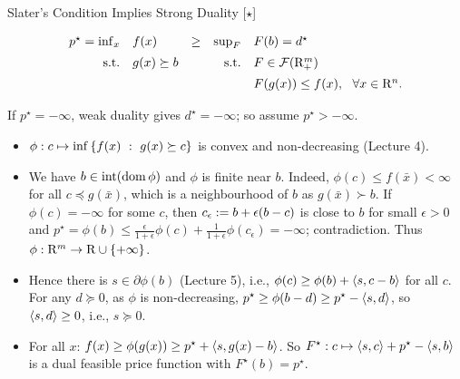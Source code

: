 \documentclass[9pt]{beamer}
\begin{document}
\begin{frame}{Slater's Condition Implies Strong Duality [$\star$]}

  \[
    \begin{array}{rlcrl}
      p^\star= \inf_x & f(x)  & \geq & \sup_F & F(b) = d^\star \\[0.5em]
      \mathrm{s.t.} & g(x) \succeq b   & &                       \mathrm{s.t.} & F \in \mathcal F(\mathrm{R}^m_+) \\[0.5em]
             & &&    & F(g(x)) \leq f(x), ~~\forall x \in \mathrm{R}^n.
    \end{array}
  \]

  If $p^\star=-\infty$, weak duality gives $d^\star=-\infty$; so assume $p^\star>-\infty$.  

  \vfill

  \begin{itemize}
    \setlength\itemsep{1em}
  \item<2-> $\phi: c \mapsto \inf\left\{ f(x)\ : \ g(x)\succeq c \right\}$ is convex and non-decreasing (Lecture 4).
  \item<3-> We have $b\in\operatorname{int}(\operatorname{dom}\phi)$ and $\phi$ is finite near $b$.
    Indeed,
    $\phi(c)\leq f(\bar x)<\infty$ for all $c\preceq g(\bar x)$, which is a neighbourhood of $b$ as $g(\bar x)\succ b$. If $\phi(c)=-\infty$ for some $c$, then $c_\epsilon:= b+\epsilon(b-c)$ is close to $b$ for small $\epsilon>0$ and $p^\star=\phi(b)\leq\frac{\epsilon}{1+\epsilon}\phi(c)+\frac{1}{1+\epsilon}\phi(c_\epsilon)=-\infty$; contradiction. Thus $\phi:\mathrm{R}^m\to\mathrm{R}\cup\{+\infty\}$.
  \item<4-> Hence there is $s\in\partial\phi(b)$ (Lecture 5), i.e., $\phi(c)\geq\phi(b)+\left<s, c-b\right>$ for all $c$. For any $d\succeq 0$, as $\phi$ is non-decreasing, $p^\star\geq\phi(b-d)\geq p^\star-\left<s, d\right>$, so $\left<s, d\right>\geq 0$, i.e., $s\succeq 0$.
  \item<5-> For all $x$: $f(x)\geq\phi(g(x))\geq p^\star+\left<s, g(x)-b\right>$. So $F^\star: c\mapsto\left<s, c\right>+p^\star-\left<s, b\right>$ is a dual feasible price function with $F^\star(b)=p^\star$.
  \end{itemize}

  \vfill

\end{frame}
\end{document}
